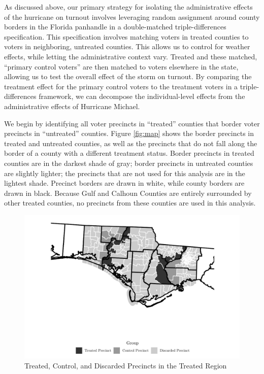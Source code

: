 \documentclass[
  12pt,
]{article}
\begin{document}
As discussed above, our primary strategy for isolating the administrative effects of the hurricane on turnout involves leveraging random assignment around county borders in the Florida panhandle in a double-matched triple-differences specification. This specification involves matching voters in treated counties to voters in neighboring, untreated counties. This allows us to control for weather effects, while letting the administrative context vary. Treated and these matched, ``primary control voters'' are then matched to voters elsewhere in the state, allowing us to test the overall effect of the storm on turnout. By comparing the treatment effect for the primary control voters to the treatment voters in a triple-differences framework, we can decompose the individual-level effects from the administrative effects of Hurricane Michael.

We begin by identifying all voter precincts in ``treated'' counties that border voter precincts in ``untreated'' counties. Figure \ref{fig:map} shows the border precincts in treated and untreated counties, as well as the precincts that do not fall along the border of a county with a different treatment status. Border precincts in treated counties are in the darkest shade of gray; border precincts in untreated counties are slightly lighter; the precincts that are not used for this analysis are in the lightest shade. Precinct borders are drawn in white, while county borders are drawn in black. Because Gulf and Calhoun Counties are entirely surrounded by other treated counties, no precincts from these counties are used in this analysis.

\begin{figure}[H]

{\centering \includegraphics{hurricane_michael_files/figure-latex/map-chunk-1} 

}

\caption{\label{fig:map}Treated, Control, and Discarded Precincts in the Treated Region}\label{fig:map-chunk}
\end{figure}
\end{document}
